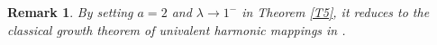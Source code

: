 \documentclass[11pt, reqno]{amsart}
\newtheorem{cor}{Corollary}
\newtheorem{rem}{Remark}
\numberwithin{equation}{section}
\newcommand{\D}{\mbox{$\mathbb{D}$}}
\begin{document}
\begin{rem}{\rm
 By setting $a=2$ and $\lambda\rightarrow 1^-$ in Theorem \ref{T5}, it reduces to the classical
 growth theorem of univalent harmonic mappings in
 \cite[Theorem 1]{sh}.}
\end{rem}



\end{document}
